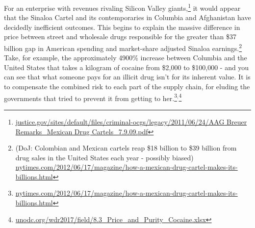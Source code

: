 \documentclass[12pt]{article}
\begin{document}
For an enterprise with revenues rivaling Silicon Valley giants,\footnote{\url{justice.gov/sites/default/files/criminal-ocgs/legacy/2011/06/24/AAG Breuer Remarks_Mexican Drug Cartels_7.9.09.pdf}}
it would appear that the Sinaloa Cartel and its contemporaries in Columbia and Afghanistan have decidedly inefficient outcomes. This begins to explain the massive difference in price between street and wholesale drugs responsible for the greater than \$37 billion gap in American spending and market-share adjusted Sinaloa earnings.\footnote{(DoJ: Colombian and Mexican cartels reap \$18 billion to \$39 billion from drug sales in the United States each year - possibly biased) \url{nytimes.com/2012/06/17/magazine/how-a-mexican-drug-cartel-makes-its-billions.html}} %
Take, for example, the approximately 4900\% increase between Columbia and the United States that takes a kilogram of cocaine from \$2,000 to \$100,000 - and you can see that what someone pays for an illicit drug isn't for its inherent value. It is to compensate the combined risk to each part of the supply chain, for eluding the governments that tried to prevent it from getting to her.\footnote{\url{nytimes.com/2012/06/17/magazine/how-a-mexican-drug-cartel-makes-its-billions.html}}$^,$\footnote{\url{unodc.org/wdr2017/field/8.3_Price_and_Purity_Cocaine.xlsx}}







\end{document}
